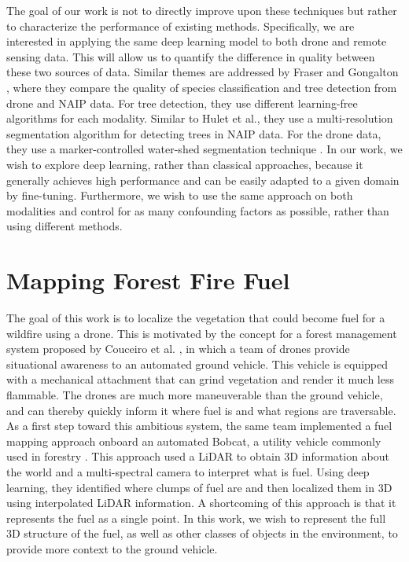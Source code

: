 The goal of our work is not to directly improve upon these techniques but rather to characterize the performance of existing methods. Specifically, we are interested in applying the same deep learning model to both drone and remote sensing data. This will allow us to quantify the difference in quality between these two sources of data. Similar themes are addressed by Fraser and Gongalton \cite{Fraser2021AImagery}, where they compare the quality of species classification and tree detection from drone and NAIP data. For tree detection, they use different learning-free algorithms for each modality. Similar to Hulet et al., they use a multi-resolution segmentation algorithm \cite{Baatz2000MultiresolutionS} for detecting trees in NAIP data. For the drone data, they use a marker-controlled water-shed segmentation technique \cite{Chen2018ReviewEvaluation}. In our work, we wish to explore deep learning, rather than classical approaches, because it generally achieves high performance and can be easily adapted to a given domain by fine-tuning. Furthermore, we wish to use the same approach on both modalities and control for as many confounding factors as possible, rather than using different methods.



\section{Mapping Forest Fire Fuel}
The goal of this work is to localize the vegetation that could become fuel for a wildfire using a drone. This is motivated by the concept for a forest management system proposed by Couceiro et al. \cite{Couceiro2019SEMFIRE:Systems}, in which a team of drones provide situational awareness to an automated ground vehicle. This vehicle is equipped with a mechanical attachment that can grind vegetation and render it much less flammable. The drones are much more maneuverable than the ground vehicle, and can thereby quickly inform it where fuel is and what regions are traversable. As a first step toward this ambitious system, the same team implemented a fuel mapping approach onboard an automated Bobcat, a utility vehicle commonly used in forestry \cite{Andrada2022IntegrationRobotics}. This approach used a LiDAR to obtain 3D information about the world and a multi-spectral camera to interpret what is fuel. Using deep learning, they identified where clumps of fuel are and then localized them in 3D using interpolated LiDAR information. A shortcoming of this approach is that it represents the fuel as a single point. In this work, we wish to represent the full 3D structure of the fuel, as well as other classes of objects in the environment, to provide more context to the ground vehicle. 

